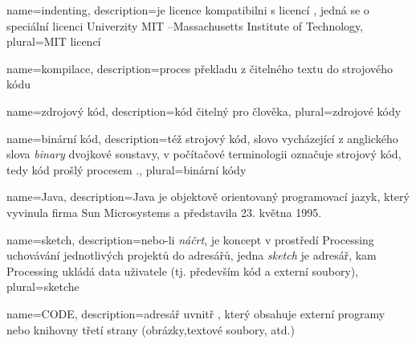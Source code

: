 {
  name={indenting},
  description={je licence kompatibilni s licencí , jedná se o speciální licenci Univerzity MIT --Massachusetts Institute of Technology},
  plural={MIT licencí}
}


{
	name={kompilace},
	description={proces překladu z čitelného textu do strojového kódu}
}

{
	name={zdrojový kód},
	description={kód čitelný pro člověka},
	plural={zdrojové kódy}
}

{
	name={binární kód},
	description={též strojový kód, slovo vycházející z anglického slova {\em binary} dvojkové soustavy, v počítačové terminologii označuje strojový kód, tedy kód prošlý procesem .},
	plural={binární kódy}
}

{
	name={Java},
	description={Java je objektově orientovaný programovací jazyk, který vyvinula firma Sun Microsystems a představila 23. května 1995.}
}

{
	name={sketch},
	description={nebo-li {\em náčrt}, je koncept v prostředí Processing uchovávání jednotlivých projektů do adresářů, jedna {\em sketch} je adresář, kam Processing ukládá data uživatele (tj. především kód a externí soubory)},
	plural={sketche}
}

{
	name={CODE},
	description={adresář uvnitř , který obsahuje externí   programy nebo knihovny třetí strany (obrázky,textové soubory, atd.)}
}

